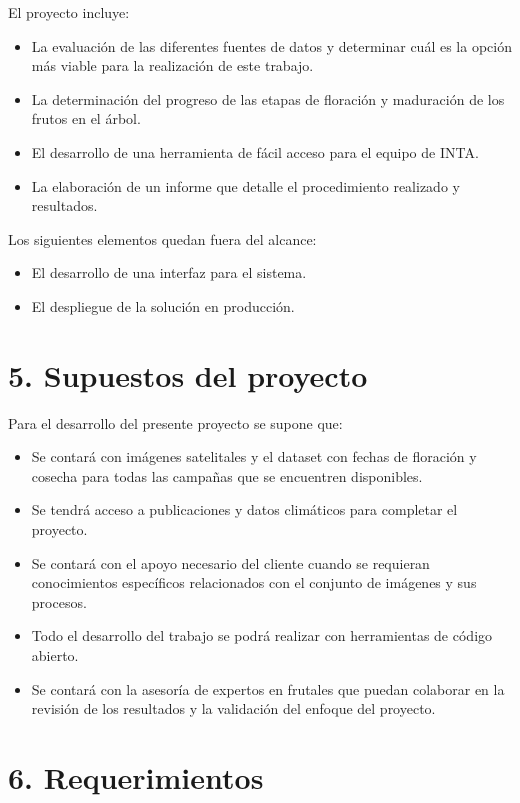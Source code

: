 \documentclass[
11pt, %
]{charter}
\begin{document}
El proyecto incluye:
\begin{itemize}
	\item La evaluación de las diferentes fuentes de datos y determinar cuál es la opción más viable para la realización de este trabajo.
	\item La determinación del progreso de las etapas de floración y maduración de los frutos en el árbol.
	\item El desarrollo de una herramienta de fácil acceso para el equipo de INTA.
	\item La elaboración de un informe que detalle el procedimiento realizado y resultados.
\end{itemize}

Los siguientes elementos quedan fuera del alcance:
\begin{itemize}
	\item El desarrollo de una interfaz para el sistema. 	
	\item El despliegue de la solución en producción.
\end{itemize}


\section{5. Supuestos del proyecto}
\label{sec:supuestos}

Para el desarrollo del presente proyecto se supone que: 

\begin{itemize}
	\item Se contará con imágenes satelitales y el dataset con fechas de floración y cosecha 
	para todas las campañas que se encuentren disponibles.	
	\item Se tendrá acceso a publicaciones y datos climáticos para completar el proyecto.
	\item Se contará con el apoyo necesario del cliente cuando se requieran conocimientos específicos
	relacionados con el conjunto de imágenes y sus procesos.
	\item Todo el desarrollo del trabajo se podrá realizar con herramientas de código abierto.
	\item Se contará con la asesoría de expertos en frutales que puedan colaborar en la revisión
    de los resultados y la validación del enfoque del proyecto.
\end{itemize}



\section{6. Requerimientos}
\label{sec:requerimientos}
\end{document}
